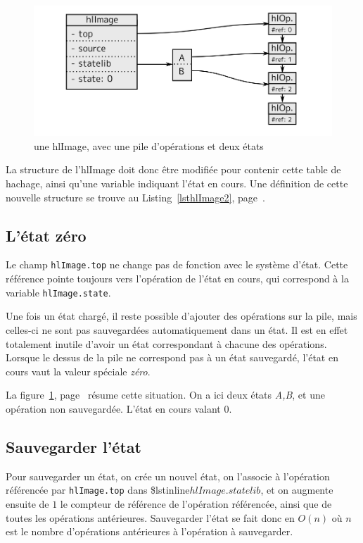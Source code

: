 		\begin{figure}[ht]
			\centering
			\includegraphics[width=\textwidth]{images/hlImage2} 
			\caption{une hlImage, avec une pile d'opérations et deux états}
			\label{fig:hlImage2}
		\end{figure}

			La structure de l'hlImage doit donc être modifiée pour contenir cette table de hachage, ainsi qu'une variable indiquant l'état en cours.
			Une définition de cette nouvelle structure se trouve au Listing~\ref{lsthlImage2}, page~\pageref{lsthlImage2}.
		\subsection{L'état zéro}
		Le champ \lstinline$hlImage.top$ ne change pas de fonction avec le système d'état. Cette référence pointe toujours vers 
		l'opération de l'état en cours, qui correspond à la variable 
		\lstinline$hlImage.state$. 

		Une fois un état chargé, il reste possible d'ajouter des opérations sur la pile, mais celles-ci ne sont pas sauvegardées automatiquement dans
		un état. Il est en effet totalement inutile d'avoir un état correspondant à chacune des opérations. 
		Lorsque le dessus de la pile ne correspond pas à un état sauvegardé, l'état en cours vaut la valeur spéciale \emph{zéro}.

		La figure~\ref{fig:hlImage2}, page~\pageref{fig:hlImage2} résume cette situation. On a ici deux états \emph{A,B}, et une opération non sauvegardée.
		L'état en cours valant $0$.

		\subsection{Sauvegarder l'état}
		Pour sauvegarder un état, on crée un nouvel état, on l'associe à l'opération référencée par \lstinline$hlImage.top$ dans 
		\$lstinline$hlImage.statelib$, et on augmente ensuite de $1$ le compteur de référence de l'opé\-ration référencée, ainsi que de toutes les opérations
		antérieures. Sauvegarder l'état se fait donc en $O(n)$ où $n$ est le nombre d'opérations antérieures à l'opération à sauvegarder.
